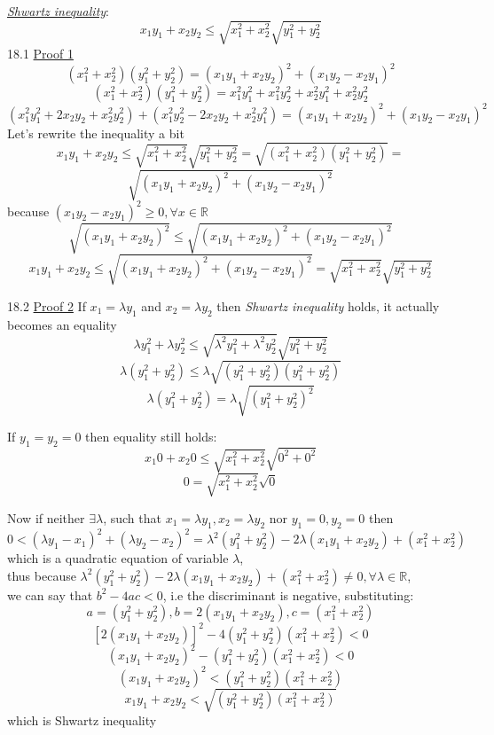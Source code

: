 \documentclass[a4paper, 11pt]{article}
\begin{document}
\hrulefill

\underline{\emph{Shwartz inequality}}:
$$x_1y_1 + x_2y_2 \leq \sqrt{x_1^2 + x_2^2}\sqrt{y_1^2 + y_2^2}$$
18.1 \underline{Proof 1}
$$(x_1^2 + x_2^2)(y_1^2 + y_2^2) = (x_1y_1 + x_2y_2)^2 + (x_1y_2 - x_2y_1)^2$$
$$(x_1^2 + x_2^2)(y_1^2 + y_2^2) = x_1^2y_1^2 + x_1^2y_2^2 + x_2^2y_1^2 + x_2^2y_2^2$$
$$(x_1^2y_1^2 + 2x_2y_2 + x_2^2y_2^2) + (x_1^2y_2^2 - 2x_2y_2 + x_2^2y_1^2) = (x_1y_1 + x_2y_2)^2 + (x_1y_2 - x_2y_1)^2$$
Let's rewrite the inequality a bit
$$x_1y_1 + x_2y_2 \leq \sqrt{x_1^2 + x_2^2}\sqrt{y_1^2 + y_2^2} = \sqrt{(x_1^2 + x_2^2)(y_1^2 + y_2^2)} = $$
$$\sqrt{(x_1y_1 + x_2y_2)^2 + (x_1y_2 - x_2y_1)^2}$$
because $(x_1y_2 - x_2y_1)^2 \geq 0, \forall x \in \mathbb{R}$ 
$$\sqrt{(x_1y_1 + x_2y_2)^2} \leq \sqrt{(x_1y_1 + x_2y_2)^2 + (x_1y_2 - x_2y_1)^2}$$
$$x_1y_1 + x_2y_2 \leq \sqrt{(x_1y_1 + x_2y_2)^2 + (x_1y_2 - x_2y_1)^2} = \sqrt{x_1^2 + x_2^2}\sqrt{y_1^2 + y_2^2}$$

\hrulefill

18.2 \underline{Proof 2}
If $x_1 = \lambda y_1$ and $x_2 = \lambda y_2$ then \emph{Shwartz inequality} holds, it actually becomes an equality
$$\lambda y_1^2 + \lambda y_2^2 \leq \sqrt{\lambda^2 y_1^2 + \lambda^2 y_2^2}\sqrt{y_1^2 + y_2^2}$$
$$\lambda (y_1^2 + y_2^2) \leq \lambda \sqrt{(y_1^2 + y_2^2)(y_1^2 + y_2^2)}$$
$$\lambda (y_1^2 + y_2^2) = \lambda \sqrt{(y_1^2 + y_2^2)^2}$$

If $y_1 = y_2 = 0$ then equality still holds:
$$x_1 0 + x_2 0 \leq \sqrt{x_1^2 + x_2^2}\sqrt{0^2 + 0^2}$$
$$0 = \sqrt{x_1^2 + x_2^2} \sqrt{0}$$

Now if neither $\exists \lambda$, such that $x_1 = \lambda y_1, x_2 = \lambda y_2$ nor $y_1 = 0, y_2 = 0$ then
$$0 < (\lambda y_1 - x_1)^2 + (\lambda y_2 - x_2)^2 = \lambda^2(y_1^2 + y_2^2) - 2\lambda(x_1y_1 + x_2y_2) + (x_1^2 + x_2^2)$$
which is a quadratic equation of variable $\lambda$,\\
thus because $\lambda^2(y_1^2 + y_2^2) - 2\lambda(x_1y_1 + x_2y_2) + (x_1^2 + x_2^2) \ne 0, \forall \lambda \in \mathbb{R}$,\\
we can say that $b^2 - 4ac < 0$, i.e the discriminant is negative, substituting:
$$a = (y_1^2 + y_2^2), b = 2(x_1y_1 + x_2y_2), c = (x_1^2 + x_2^2)$$
$$[2(x_1y_1 + x_2y_2)]^2 - 4(y_1^2 + y_2^2)(x_1^2 + x_2^2) < 0$$
$$(x_1y_1 + x_2y_2)^2 - (y_1^2 + y_2^2)(x_1^2 + x_2^2) < 0$$
$$(x_1y_1 + x_2y_2)^2 < (y_1^2 + y_2^2)(x_1^2 + x_2^2)$$
$$x_1y_1 + x_2y_2 < \sqrt{(y_1^2 + y_2^2)(x_1^2 + x_2^2)}$$
which is Shwartz inequality

\hrulefill
\end{document}

